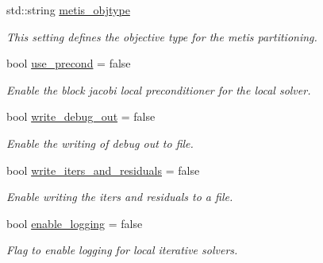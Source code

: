 \begin{DoxyCompactItemize}
\mbox{\label{structschwz_1_1Settings_a8a057e4ac5331c9222ad539ffd1f5c3d}} 
std\+::string \hyperlink{structschwz_1_1Settings_a8a057e4ac5331c9222ad539ffd1f5c3d}{metis\+\_\+objtype}
\begin{DoxyCompactList}\small\item\em This setting defines the objective type for the metis partitioning. \end{DoxyCompactList}\item 
\mbox{\label{structschwz_1_1Settings_ab51cf8eda75e05280084e89895121ca7}} 
bool \hyperlink{structschwz_1_1Settings_ab51cf8eda75e05280084e89895121ca7}{use\+\_\+precond} = false
\begin{DoxyCompactList}\small\item\em Enable the block jacobi local preconditioner for the local solver. \end{DoxyCompactList}\item 
\mbox{\label{structschwz_1_1Settings_af81ff061a4d7220d380fb7f579d7a6e1}} 
bool \hyperlink{structschwz_1_1Settings_af81ff061a4d7220d380fb7f579d7a6e1}{write\+\_\+debug\+\_\+out} = false
\begin{DoxyCompactList}\small\item\em Enable the writing of debug out to file. \end{DoxyCompactList}\item 
\mbox{\label{structschwz_1_1Settings_a5555cf4340e7918ce22d00b26ccca6a7}} 
bool \hyperlink{structschwz_1_1Settings_a5555cf4340e7918ce22d00b26ccca6a7}{write\+\_\+iters\+\_\+and\+\_\+residuals} = false
\begin{DoxyCompactList}\small\item\em Enable writing the iters and residuals to a file. \end{DoxyCompactList}\item 
bool \hyperlink{structschwz_1_1Settings_a2b683340720aadaba85255580483f684}{enable\+\_\+logging} = false
\begin{DoxyCompactList}\small\item\em Flag to enable logging for local iterative solvers. \end{DoxyCompactList}\item 
\mbox{\label{structschwz_1_1Settings_af692ca8550d16b538dcfddb5208e73f3}} 

\end{DoxyCompactItemize}
